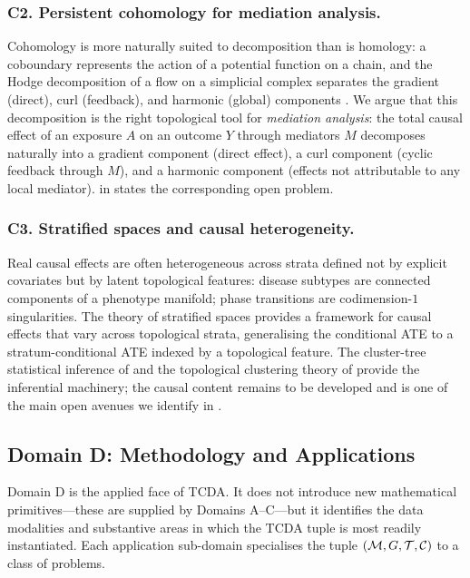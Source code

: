 \subsubsection*{C2. Persistent cohomology for mediation analysis.}
Cohomology is more naturally suited to decomposition than is homology:
a coboundary represents the action of a potential function on a chain,
and the Hodge decomposition of a flow on a simplicial complex separates
the gradient (direct), curl (feedback), and harmonic (global)
components \citep{nocurl2024,desilva2007coverage}. We argue that this
decomposition is the right topological tool for \emph{mediation
analysis}: the total causal effect of an exposure $A$ on an outcome $Y$
through mediators $M$ decomposes naturally into a gradient component
(direct effect), a curl component (cyclic feedback through $M$), and a
harmonic component (effects not attributable to any local mediator).
 in  states the
corresponding open problem.

\subsubsection*{C3. Stratified spaces and causal heterogeneity.}
Real causal effects are often heterogeneous across strata defined not
by explicit covariates but by latent topological features: disease
subtypes are connected components of a phenotype manifold; phase
transitions are codimension-$1$ singularities. The theory of stratified
spaces \citep{hughes2004stratified,banagl2007topological} provides a
framework for causal effects that vary across topological strata,
generalising the conditional ATE to a stratum-conditional ATE indexed
by a topological feature. The cluster-tree statistical inference of
\citet{lecci2014statistical} and the topological clustering theory of
\citet{chazal2013persistence} provide the inferential machinery; the
causal content remains to be developed and is one of the main open
avenues we identify in .

\subsection{Domain D: Methodology and Applications}\label{sec:domain-D}

Domain D is the applied face of TCDA. It does not introduce new
mathematical primitives---these are supplied by Domains A--C---but it
identifies the data modalities and substantive areas in which the
TCDA tuple is most readily instantiated. Each application sub-domain
specialises the tuple $(\mathcal{M}, G, \mathcal{T}, \mathcal{C})$ to a class of problems.

